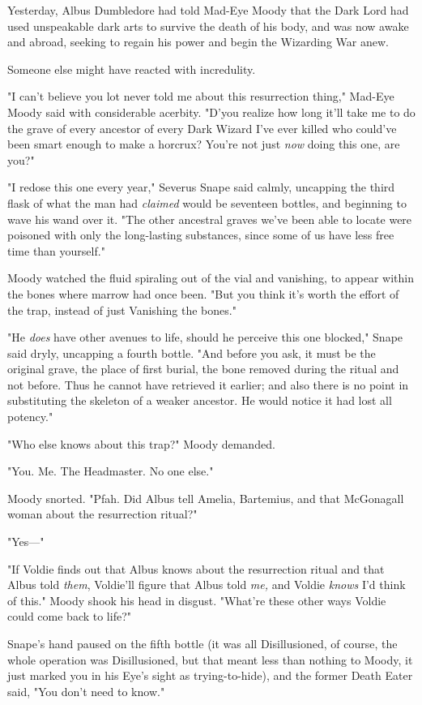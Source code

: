 Yesterday, Albus Dumbledore had told Mad-Eye Moody that the Dark Lord had used 
unspeakable dark arts to survive the death of his body, and was now awake and 
abroad, seeking to regain his power and begin the Wizarding War anew.

Someone else might have reacted with incredulity.

"I can't believe you lot never told me about this resurrection thing," Mad-Eye 
Moody said with considerable acerbity. "D'you realize how long it'll take me to 
do the grave of every ancestor of every Dark Wizard I've ever killed who 
could've been smart enough to make a horcrux? You're not just \emph{now} doing 
this one, are you?"

"I redose this one every year," Severus Snape said calmly, uncapping the third 
flask of what the man had \emph{claimed} would be seventeen bottles, and 
beginning to wave his wand over it. "The other ancestral graves we've been able 
to locate were poisoned with only the long-lasting substances, since some of us 
have less free time than yourself."

Moody watched the fluid spiraling out of the vial and vanishing, to appear 
within the bones where marrow had once been. "But you think it's worth the 
effort of the trap, instead of just Vanishing the bones."

"He \emph{does} have other avenues to life, should he perceive this one 
blocked," Snape said dryly, uncapping a fourth bottle. "And before you ask, it 
must be the original grave, the place of first burial, the bone removed during 
the ritual and not before. Thus he cannot have retrieved it earlier; and also 
there is no point in substituting the skeleton of a weaker ancestor. He would 
notice it had lost all potency."

"Who else knows about this trap?" Moody demanded.

"You. Me. The Headmaster. No one else."

Moody snorted. "Pfah. Did Albus tell Amelia, Bartemius, and that McGonagall 
woman about the resurrection ritual?"

"Yes---"

"If Voldie finds out that Albus knows about the resurrection ritual and that 
Albus told \emph{them}, Voldie'll figure that Albus told \emph{me,} and Voldie 
\emph{knows} I'd think of this." Moody shook his head in disgust. "What're 
these other ways Voldie could come back to life?"

Snape's hand paused on the fifth bottle (it was all Disillusioned, of course, 
the whole operation was Disillusioned, but that meant less than nothing to 
Moody, it just marked you in his Eye's sight as trying-to-hide), and the former 
Death Eater said, "You don't need to know."


